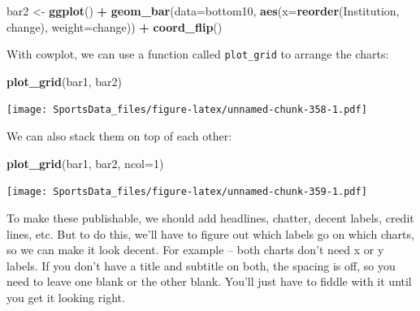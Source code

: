 \documentclass[
]{book}
\newenvironment{Shaded}{\begin{snugshade}}{\end{snugshade}}
\newcommand{\DataTypeTok}[1]{\textcolor[rgb]{0.13,0.29,0.53}{#1}}
\newcommand{\DecValTok}[1]{\textcolor[rgb]{0.00,0.00,0.81}{#1}}
\newcommand{\KeywordTok}[1]{\textcolor[rgb]{0.13,0.29,0.53}{\textbf{#1}}}
\newcommand{\NormalTok}[1]{#1}
\newcommand{\OperatorTok}[1]{\textcolor[rgb]{0.81,0.36,0.00}{\textbf{#1}}}
\newcommand{\StringTok}[1]{\textcolor[rgb]{0.31,0.60,0.02}{#1}}
\begin{document}
\begin{Shaded}
\begin{Highlighting}[]
\NormalTok{bar2 <-}\StringTok{ }\KeywordTok{ggplot}\NormalTok{() }\OperatorTok{+}\StringTok{ }\KeywordTok{geom_bar}\NormalTok{(}\DataTypeTok{data=}\NormalTok{bottom10, }\KeywordTok{aes}\NormalTok{(}\DataTypeTok{x=}\KeywordTok{reorder}\NormalTok{(Institution, change), }\DataTypeTok{weight=}\NormalTok{change)) }\OperatorTok{+}\StringTok{ }\KeywordTok{coord_flip}\NormalTok{()}
\end{Highlighting}
\end{Shaded}

With cowplot, we can use a function called \texttt{plot\_grid} to arrange the charts:

\begin{Shaded}
\begin{Highlighting}[]
\KeywordTok{plot_grid}\NormalTok{(bar1, bar2) }
\end{Highlighting}
\end{Shaded}

\texttt{[image: SportsData\_files/figure-latex/unnamed-chunk-358-1.pdf]}

We can also stack them on top of each other:

\begin{Shaded}
\begin{Highlighting}[]
\KeywordTok{plot_grid}\NormalTok{(bar1, bar2, }\DataTypeTok{ncol=}\DecValTok{1}\NormalTok{) }
\end{Highlighting}
\end{Shaded}

\texttt{[image: SportsData\_files/figure-latex/unnamed-chunk-359-1.pdf]}

To make these publishable, we should add headlines, chatter, decent labels, credit lines, etc. But to do this, we'll have to figure out which labels go on which charts, so we can make it look decent. For example -- both charts don't need x or y labels. If you don't have a title and subtitle on both, the spacing is off, so you need to leave one blank or the other blank. You'll just have to fiddle with it until you get it looking right.
\end{document}
